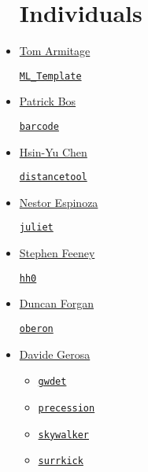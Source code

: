 \documentclass[11pt,a4paper]{article}
\begin{document}
\begin{itemize}
  
\section*{Individuals}  
 
\item \href{https://github.com/TomArmitage}{Tom Armitage}
  \begin{itemize}
    \href{https://github.com/TomArmitage/ML\_Template}{{\tt ML\_Template}}
  \end{itemize}

\item \href{https://github.com/egpbos}{Patrick Bos}
  \begin{itemize}
    \href{https://github.com/egpbos/barcode}{{\tt barcode}}
  \end{itemize}
  
\item \href{https://github.com/hsinyuc}{Hsin-Yu Chen} 
  \begin{itemize}
    \href{https://github.com/hsinyuc/distancetool}{\tt distancetool}
  \end{itemize}


\item \href{https://github.com/nespinoza}{Nestor Espinoza}
  \begin{itemize}
    \href{https://github.com/nespinoza/juliet}{\tt juliet}
  \end{itemize}

\item \href{https://github.com/sfeeney}{Stephen Feeney}
  \begin{itemize}
    \href{https://github.com/sfeeney/hh0}{{\tt hh0}}
  \end{itemize}

\item \href{https://github.com/dh4gan/}{Duncan Forgan}
  \begin{itemize}
    \href{https://github.com/dh4gan/oberon}{\tt oberon}
  \end{itemize}

\item \href{https://github.com/dgerosa/}{Davide Gerosa}
  \begin{itemize}
   \item \href{https://github.com/dgerosa/gwdet}{\tt gwdet}
   \item \href{https://github.com/dgerosa/precession}{\tt precession}
   \item \href{https://github.com/dgerosa/skywalker}{\tt skywalker}
   \item \href{https://github.com/dgerosa/surrkick}{\tt surrkick}


\end{itemize}
\end{itemize}
\end{document}

